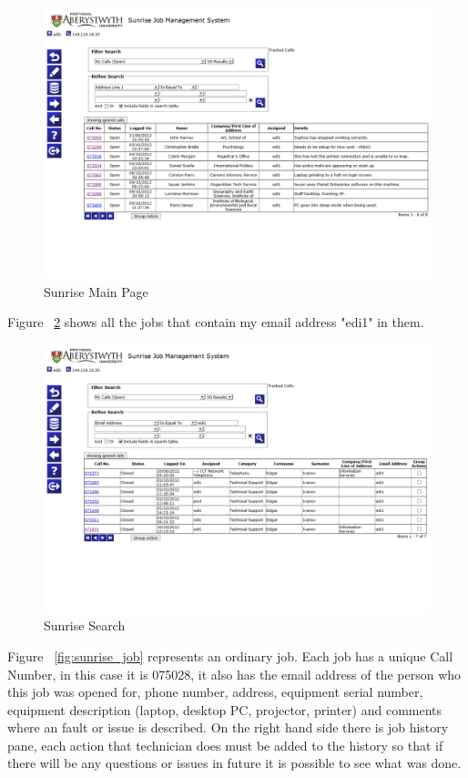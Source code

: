\documentclass[10pt,a4paper,headinclude=true]{report}
\begin{document}
\begin{figure}[H]
\centering
\centerline{\includegraphics[scale=0.5]{./sunrise_main}}
\caption{Sunrise Main Page}
\label{fig:sunrise_main}
\end{figure}

Figure ~\ref{fig:sunrise_search} shows all the jobs that contain my email address "edi1" in them.

\begin{figure}[H]
\centering
\centerline{\includegraphics[scale=0.5]{./sunrise_search}}
\caption{Sunrise Search}
\label{fig:sunrise_search}
\end{figure}

Figure ~\ref{fig:sunrise_job} represents an ordinary job. Each job has a unique Call Number, in this case it is 075028, it also has the email address of the person who this job was opened for, phone number, address, equipment serial number, equipment description (laptop, desktop PC, projector, printer) and comments where an fault or issue is described. On the right hand side there is job history pane, each action that technician does must be added to the history so that if there will be any questions or issues in future it is possible to see what was done.
\end{document}
